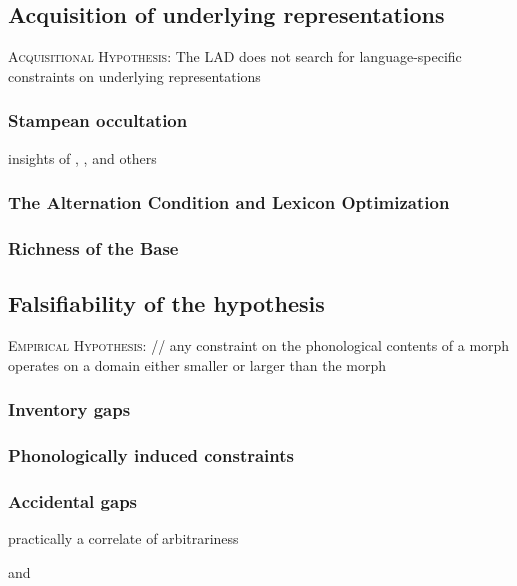 \subsection{Acquisition of underlying representations}

\ex \textsc{Acquisitional Hypothesis}: The LAD does not search for language-specific constraints on underlying representations \xe

\subsubsection{Stampean occultation}

insights of \citeauthor{Stampe1979}, \citeauthor{Dell1973}, and others

\subsubsection{The Alternation Condition and Lexicon Optimization}

\subsubsection{Richness of the Base}


\subsection{Falsifiability of the hypothesis}

\ex \textsc{Empirical Hypothesis}: // any constraint on the phonological contents of a morph operates on a domain either smaller or larger than the morph \xe

\subsubsection{Inventory gaps}

\subsubsection{Phonologically induced constraints}

\subsubsection{Accidental gaps}

practically a correlate of arbitrariness

\citet[][]{Fischer-Jorgensen1952} and \citet{Vogt1954}

